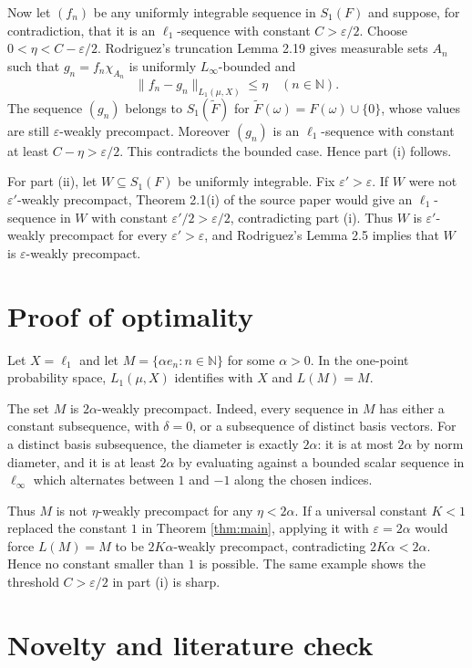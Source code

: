\documentclass[11pt]{article}
\newcommand{\eps}{\varepsilon}
\newcommand{\N}{\mathbb N}
\newcommand{\sub}{\subseteq}
\begin{document}
Now let $(f_n)$ be any uniformly integrable sequence in $S_1(F)$ and suppose,
for contradiction, that it is an $\ell_1$-sequence with constant $C>\eps/2$.
Choose $0<\eta<C-\eps/2$. Rodriguez's truncation Lemma 2.19 gives measurable
sets $A_n$ such that $g_n=f_n\chi_{A_n}$ is uniformly $L_\infty$-bounded and
\[
\|f_n-g_n\|_{L_1(\mu,X)}\leq\eta\quad(n\in\N).
\]
The sequence $(g_n)$ belongs to $S_1(\widetilde F)$ for
$\widetilde F(\omega)=F(\omega)\cup\{0\}$, whose values are still
$\eps$-weakly precompact. Moreover $(g_n)$ is an $\ell_1$-sequence with
constant at least $C-\eta>\eps/2$. This contradicts the bounded case. Hence
part (i) follows.

For part (ii), let $W\sub S_1(F)$ be uniformly integrable. Fix
$\eps'>\eps$. If $W$ were not $\eps'$-weakly precompact, Theorem 2.1(i) of the
source paper would give an $\ell_1$-sequence in $W$ with constant
$\eps'/2>\eps/2$, contradicting part (i). Thus $W$ is $\eps'$-weakly precompact
for every $\eps'>\eps$, and Rodriguez's Lemma 2.5 implies that $W$ is
$\eps$-weakly precompact.

\section*{Proof of optimality}

Let $X=\ell_1$ and let $M=\{\alpha e_n:n\in\N\}$ for some $\alpha>0$. In the
one-point probability space, $L_1(\mu,X)$ identifies with $X$ and
$L(M)=M$.

The set $M$ is $2\alpha$-weakly precompact. Indeed, every sequence in $M$ has
either a constant subsequence, with $\delta=0$, or a subsequence of distinct
basis vectors. For a distinct basis subsequence, the diameter is exactly
$2\alpha$: it is at most $2\alpha$ by norm diameter, and it is at least
$2\alpha$ by evaluating against a bounded scalar sequence in $\ell_\infty$
which alternates between $1$ and $-1$ along the chosen indices.

Thus $M$ is not $\eta$-weakly precompact for any $\eta<2\alpha$. If a universal
constant $K<1$ replaced the constant $1$ in Theorem \ref{thm:main}, applying it
with $\eps=2\alpha$ would force $L(M)=M$ to be $2K\alpha$-weakly precompact,
contradicting $2K\alpha<2\alpha$. Hence no constant smaller than $1$ is
possible. The same example shows the threshold $C>\eps/2$ in part (i) is sharp.

\section*{Novelty and literature check}
\end{document}

